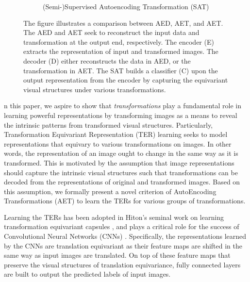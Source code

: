 \documentclass[10pt,journal,compsoc,twoside]{IEEEtran}
\begin{document}
\begin{figure}[t]
\begin{subfigure}[c]{0.33\textwidth}
        \caption{(Semi-)Supervised Autoencoding Transformation (SAT)}
    \end{subfigure}
    \caption{The figure illustrates a comparison between AED, AET, and AET. The AED and AET seek to reconstruct the input data and transformation at the output end, respectively. The encoder (E) extracts the representation of input and transformed images. The decoder (D) either reconstructs the data in AED, or the transformation in AET. The SAT builds a classifier (C) upon the output representation from the encoder by capturing the equivariant visual structures under various transformations. }\label{fig:comparison}
\end{figure}


%
%
%
%

n this paper, we aspire to show that {\em transformations} play a fundamental role in learning powerful representations by transforming images as a means to reveal the intrinsic patterns from transformed visual structures. Particularly,
Transformation Equivariant Representation (TER) learning seeks to model representations that equivary to various transformations on images.
In other words, the representation of an image ought to change in the same way as it is transformed. This is motivated by the assumption that image representations should capture the intrinsic visual structures such that transformations can be decoded from the representations of original and transformed images. Based on this assumption, we formally present a novel criterion of AutoEncoding Transformations (AET) to learn the TERs for various groups of transformations.


Learning the TERs has been adopted in Hiton's seminal work on learning transformation equivariant capsules \cite{hinton2011transforming}, and plays a critical role for the success of Convolutional Neural Networks (CNNs) \cite{krizhevsky2012imagenet}. Specifically, the representations learned by the CNNs are translation equivariant as their feature maps are shifted in the same way as input images are translated. On top of these feature maps that preserve the visual structures of translation equivariance, fully connected layers are built to output the predicted labels of input images.
\end{document}

